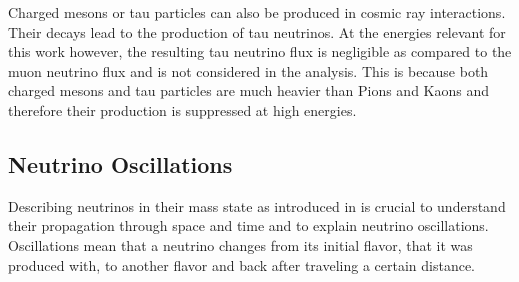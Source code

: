 Charged mesons or tau particles can also be produced in cosmic ray interactions. Their decays lead to the production of tau neutrinos. At the energies relevant for this work however, the resulting tau neutrino flux is negligible as compared to the muon neutrino flux  and is not considered in the analysis. This is because both charged mesons and tau particles are much heavier than Pions and Kaons and therefore their production is suppressed at high energies.


\subsection{Neutrino Oscillations} 

Describing neutrinos in their mass state as introduced in  is crucial to understand their propagation through space and time and to explain neutrino oscillations. Oscillations mean that a neutrino changes from its initial flavor, that it was produced with, to another flavor and back after traveling a certain distance.

